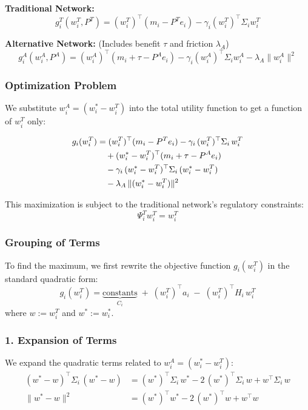 \documentclass[12pt]{article}
\begin{document}
\textbf{Traditional Network:}
\begin{equation}
g_i^T(w_i^T, P^T) = (w_i^T)^\top(m_i - P^T e_i) - \gamma_i(w_i^T)^\top\Sigma_i w_i^T
\end{equation}

\textbf{Alternative Network:} (Includes benefit $\tau$ and friction $\lambda_A$)
\begin{equation}
g_i^A(w_i^A, P^A) = (w_i^A)^\top(m_i + \tau - P^A e_i) - \gamma_i(w_i^A)^\top\Sigma_i w_i^A - \lambda_A\|w_i^A\|^2
\end{equation}

\subsubsection{Optimization Problem}
We substitute $w_i^A = (w_i^* - w_i^T)$ into the total utility function to get a function of $w_i^T$ only:

\begin{align}\label{eq:app_ut_tot}
g_i(w_i^T)
&= (w_i^T)^\top (m_i - P^T e_i)
  - \gamma_i\,(w_i^T)^\top \Sigma_i\,w_i^T \notag\\
&\quad+ (w_i^* - w_i^T)^\top (m_i + \tau - P^A e_i) \notag\\
&\quad- \gamma_i\,(w_i^* - w_i^T)^\top \Sigma_i\,(w_i^* - w_i^T) \\
&\quad - \lambda_A\,\|(w_i^* - w_i^T)\|^2 \notag
\end{align}

This maximization is subject to the traditional network's regulatory constraints:
\begin{equation}
\Psi_i^T w_i^T = w_i^T
\end{equation}

\subsubsection{Grouping of Terms}
To find the maximum, we first rewrite the objective function $g_i(w_i^T)$ in the standard quadratic form:
\[
g_i(w_i^T)
= \underbrace{\text{constants}}_{C_i}
\;+\;(w_i^T)^\top a_i
\;-\;(w_i^T)^\top H_i\,w_i^T
\]
where \(w := w_i^T\) and \(w^* := w_i^*\).

\subsubsection{1. Expansion of Terms}
We expand the quadratic terms related to $w_i^A = (w_i^* - w_i^T)$:
\begin{align*}
(w^* - w)^\top \Sigma_i\,(w^* - w)
&= (w^*)^\top \Sigma_i\,w^*
  - 2\,(w^*)^\top \Sigma_i\,w
  + w^\top \Sigma_i\,w \\
\|w^* - w\|^2
&= (w^*)^\top w^*
  - 2\,(w^*)^\top w
  + w^\top w
\end{align*}
\end{document}

